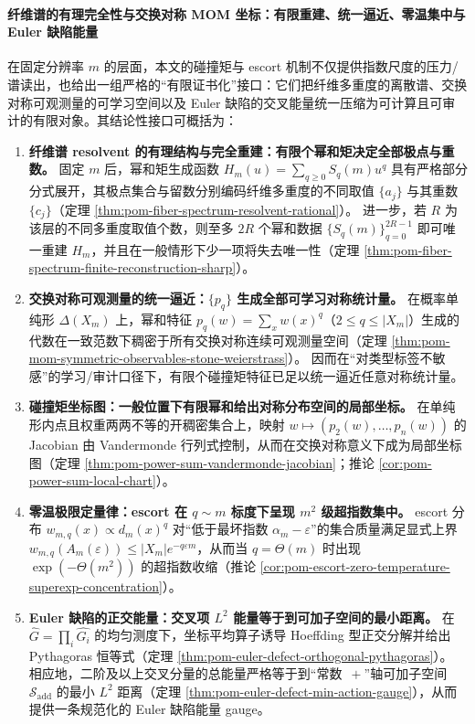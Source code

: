 \paragraph{纤维谱的有理完全性与交换对称 MOM 坐标：有限重建、统一逼近、零温集中与 Euler 缺陷能量}
在固定分辨率 \(m\) 的层面，本文的碰撞矩与 escort 机制不仅提供指数尺度的压力/谱读出，也给出一组严格的“有限证书化”接口：它们把纤维多重度的离散谱、交换对称可观测量的可学习空间以及 Euler 缺陷的交叉能量统一压缩为可计算且可审计的有限对象。其结论性接口可概括为：
\begin{enumerate}
  \item \textbf{纤维谱 resolvent 的有理结构与完全重建：有限个幂和矩决定全部极点与重数。}
  固定 \(m\) 后，幂和矩生成函数 \(H_m(u)=\sum_{q\ge 0}S_q(m)u^q\) 具有严格部分分式展开，其极点集合与留数分别编码纤维多重度的不同取值 \(\{a_j\}\) 与其重数 \(\{c_j\}\)（定理 \ref{thm:pom-fiber-spectrum-resolvent-rational}）。
  进一步，若 \(R\) 为该层的不同多重度取值个数，则至多 \(2R\) 个幂和数据 \(\{S_q(m)\}_{q=0}^{2R-1}\) 即可唯一重建 \(H_m\)，并且在一般情形下少一项将失去唯一性（定理 \ref{thm:pom-fiber-spectrum-finite-reconstruction-sharp}）。

  \item \textbf{交换对称可观测量的统一逼近：\texorpdfstring{$\{p_q\}$}{pq} 生成全部可学习对称统计量。}
  在概率单纯形 \(\Delta(X_m)\) 上，幂和特征 \(p_q(w)=\sum_x w(x)^q\)（\(2\le q\le |X_m|\)）生成的代数在一致范数下稠密于所有交换对称连续可观测量空间（定理 \ref{thm:pom-mom-symmetric-observables-stone-weierstrass}）。
  因而在“对类型标签不敏感”的学习/审计口径下，有限个碰撞矩特征已足以统一逼近任意对称统计量。

  \item \textbf{碰撞矩坐标图：一般位置下有限幂和给出对称分布空间的局部坐标。}
  在单纯形内点且权重两两不等的开稠密集合上，映射 \(w\mapsto(p_2(w),\dots,p_n(w))\) 的 Jacobian 由 Vandermonde 行列式控制，从而在交换对称意义下成为局部坐标图（定理 \ref{thm:pom-power-sum-vandermonde-jacobian}；推论 \ref{cor:pom-power-sum-local-chart}）。

  \item \textbf{零温极限定量律：escort 在 \texorpdfstring{$q\sim m$}{q~m} 标度下呈现 \texorpdfstring{$m^2$}{m^2} 级超指数集中。}
  escort 分布 \(w_{m,q}(x)\propto d_m(x)^q\) 对“低于最坏指数 \(\alpha_m-\varepsilon\)”的集合质量满足显式上界 \(w_{m,q}(A_m(\varepsilon))\le |X_m|e^{-q\varepsilon m}\)，从而当 \(q=\Theta(m)\) 时出现 \(\exp(-\Theta(m^2))\) 的超指数收缩（推论 \ref{cor:pom-escort-zero-temperature-superexp-concentration}）。

  \item \textbf{Euler 缺陷的正交能量：交叉项 \texorpdfstring{$L^2$}{L2} 能量等于到可加子空间的最小距离。}
  在 \(\widehat G=\prod_i\widehat{G_i}\) 的均匀测度下，坐标平均算子诱导 Hoeffding 型正交分解并给出 Pythagoras 恒等式（定理 \ref{thm:pom-euler-defect-orthogonal-pythagoras}）。
  相应地，二阶及以上交叉分量的总能量严格等于到“常数 \(\,+\)”轴可加子空间 \(\mathcal S_{\mathrm{add}}\) 的最小 \(L^2\) 距离（定理 \ref{thm:pom-euler-defect-min-action-gauge}），从而提供一条规范化的 Euler 缺陷能量 gauge。
\end{enumerate}

